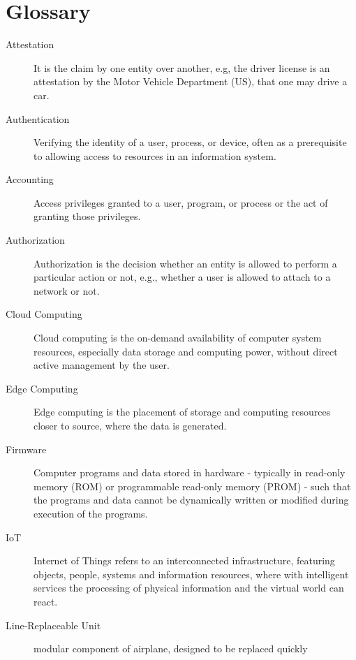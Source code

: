 \chapter*{Glossary}


\begin{description}
	\item [Attestation] It is the claim by one entity over another, e.g, the driver license is an attestation by the
	      Motor Vehicle Department (US), that one may drive a car. \cite{eth-decentralized-identity}
	\item [Authentication] Verifying the identity of a user, process, or device, often as a prerequisite to
	      allowing access to resources in an information system. \cite{nist:glossary}
	\item [Accounting] Access privileges granted to a user, program, or process or the act of granting those
	      privileges. \cite{nist:glossary}
	\item [Authorization] Authorization is the decision whether an entity is allowed to perform a particular action
	      or not, e.g., whether a user is allowed to attach to a network or not.
	\item [Cloud Computing] Cloud computing is the on-demand availability of computer system resources, especially
	      data storage and computing power, without direct active management by the user. \cite{nist:glossary}
	\item [Edge Computing] Edge computing is the placement of storage and computing resources closer to source, where
	      the data is generated. \cite{nist:glossary}
	\item [Firmware] Computer programs and data stored in hardware - typically in read-only memory (ROM) or
	      programmable read-only memory (PROM) - such that the programs and data cannot be dynamically written
	      or modified during execution of the programs. \cite{nist:glossary}
	\item [IoT] Internet of Things refers to an interconnected infrastructure, featuring objects, people, systems and
	      information resources, where with intelligent services the processing of physical information and the
	      virtual world can react. \cite{iot-guide-definition}
	\item [Line-Replaceable Unit] modular component of airplane, designed to be replaced quickly

\end{description}
